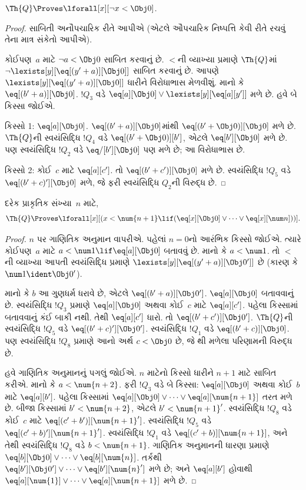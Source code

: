 \begin{lem}
$\Th{Q} \Proves \lforall[x][\lnot x < \Obj 0]$.
\end{lem}

\begin{proof}
સાબિતી અનૌપચારિક રીતે આપીએ
(એટલે ઔપચારિક નિષ્પત્તિ
કેવી રીતે રચવું તેના માત્ર સંકેતો
આપીએ).

કોઈપણ~$a$ માટે $\lnot a < \Obj 0$
સાબિત કરવાનું છે. $<$ની
વ્યાખ્યા પ્રમાણે $\Th{Q}$માં
$\lnot \lexists[y][\eq[(y'+a)][\Obj 0]]$
સાબિત કરવાનું છે. આપણે
$\lexists[y][\eq[(y'+a)][\Obj 0]]$
ધારીને વિરોધાભાસ મેળવીશું.
માનો કે $\eq[(b'+a)][\Obj 0]$.
$!Q_3$ વડે
$\eq[a][\Obj 0] \lor \lexists[y][\eq[a][y']]$
મળે છે. હવે બે કિસ્સા જોઈએ.

કિસ્સો 1: $\eq[a][\Obj 0]$.
$\eq[(b'+a)][\Obj 0]$માંથી
$\eq[(b' + \Obj 0)][\Obj 0]$
મળે છે. $\Th{Q}$ની સ્વયંસિદ્ધિ
$!Q_4$ વડે
$\eq[(b' + \Obj 0)][b']$,
એટલે $\eq[b'][\Obj 0]$ મળે છે.
પણ સ્વયંસિદ્ધિ $!Q_2$ વડે
$\eq/[b'][\Obj 0]$ પણ મળે છે;
આ વિરોધાભાસ છે.

કિસ્સો 2: કોઈ~$c$ માટે
$\eq[a][c']$. તો
$\eq[(b' + c')][\Obj 0]$ મળે છે.
સ્વયંસિદ્ધિ $!Q_5$ વડે
$\eq[(b' + c)'][\Obj 0]$ મળે,
જે ફરી સ્વયંસિદ્ધિ $Q_2$ની
વિરુદ્ધ છે.
\end{proof}

\begin{lem}
દરેક પ્રાકૃતિક સંખ્યા~$n$ માટે,
  \[
  \Th{Q} \Proves
  \lforall[x][(x < \num {n+1} \lif (\eq[x][\Obj 0] \lor \dots \lor
    \eq[x][\num n]))].
  \]
\end{lem}

\begin{proof}
$n$ પર ગાણિતિક અનુમાન વાપરીએ.
પહેલાં $n = 0$નો આરંભિક
કિસ્સો જોઈએ. ત્યારે કોઈપણ~$a$
માટે $a < \num 1 \lif
\eq[a][\Obj 0]$ બતાવવું છે.
માનો કે $a < \num 1$. તો
$<$ની વ્યાખ્યા આપતી સ્વયંસિદ્ધિ
પ્રમાણે
$\lexists[y][\eq[(y'+a)][\Obj 0']]$
છે (કારણ કે $\num 1 \ident
\Obj 0'$).

માનો કે $b$ આ ગુણધર્મ
ધરાવે છે, એટલે
$\eq[(b'+a)][\Obj 0']$.
$\eq[a][\Obj 0]$ બતાવવાનું છે.
સ્વયંસિદ્ધિ $!Q_3$ પ્રમાણે
$\eq[a][\Obj 0]$ અથવા
કોઈ~$c$ માટે $\eq[a][c']$.
પહેલા કિસ્સામાં બતાવવાનું કંઈ
બાકી નથી. તેથી
$\eq[a][c']$ ધારો. તો
$\eq[(b' + c')][\Obj 0']$.
$\Th{Q}$ની સ્વયંસિદ્ધિ $!Q_5$
વડે $\eq[(b'+c)'][\Obj 0']$.
સ્વયંસિદ્ધિ $!Q_1$ વડે
$\eq[(b' + c)][\Obj 0]$.
પણ સ્વયંસિદ્ધિ $!Q_8$ પ્રમાણે
આનો અર્થ $c < \Obj 0$ છે,
જે થી
મળેલા પરિણામની વિરુદ્ધ છે.

હવે ગાણિતિક અનુમાનનું પગલું જોઈએ.
$n$ માટેનો કિસ્સો ધારીને
$n+1$ માટે સાબિત કરીએ.
માનો કે $a < \num {n+2}$.
ફરી $!Q_3$ વડે બે કિસ્સા:
$\eq[a][\Obj 0]$ અથવા
કોઈ~$b$ માટે $\eq[a][b']$.
પહેલા કિસ્સામાં
$\eq[a][\Obj 0] \lor \dots \lor
\eq[a][\num{n+1}]$ તરત મળે છે.
બીજા કિસ્સામાં
$b' < \num {n+2}$, એટલે
$b' < \num{n+1}'$.
સ્વયંસિદ્ધિ $!Q_8$ વડે કોઈ~$c$
માટે
$\eq[(c'+b')][\num{n+1}']$.
સ્વયંસિદ્ધિ $!Q_5$ વડે
$\eq[(c'+b)'][\num{n+1}']$.
સ્વયંસિદ્ધિ $!Q_1$ વડે
$\eq[(c'+b)][\num{n+1}]$,
અને તેથી સ્વયંસિદ્ધિ $!Q_8$
વડે $b < \num{n+1}$.
ગાણિતિક અનુમાનની ધારણા પ્રમાણે
$\eq[b][\Obj 0] \lor \dots \lor
\eq[b][\num{n}]$. તર્કથી
$\eq[b'][\Obj 0'] \lor \dots \lor
\eq[b'][\num{n}']$ મળે છે;
અને $\eq[a][b']$ હોવાથી
$\eq[a][\num{1}] \lor \dots \lor
\eq[a][\num{n+1}]$ મળે છે.
\end{proof}

